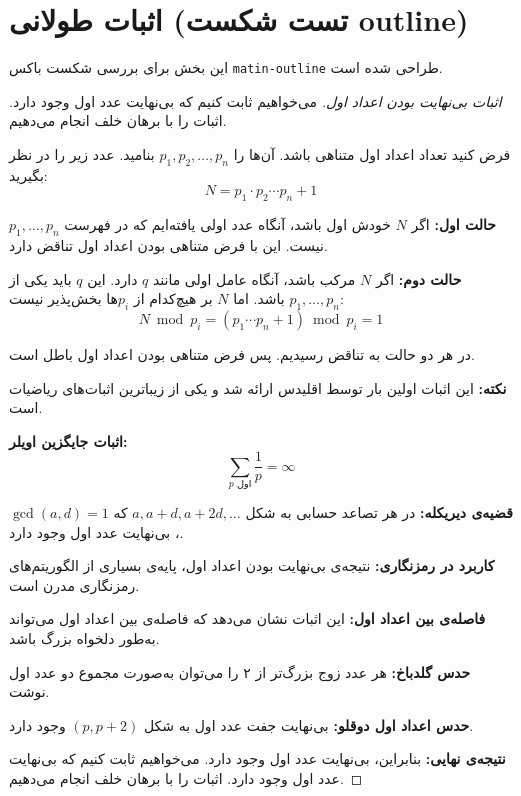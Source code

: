 \documentclass{matinbook}
\begin{document}
\section{اثبات طولانی (تست شکست outline)}
\label{sec:long-proof}

این بخش برای بررسی شکست باکس \texttt{matin-outline} طراحی
شده است.

\begin{proof}[اثبات بی‌نهایت بودن اعداد اول]
    می‌خواهیم ثابت کنیم که بی‌نهایت عدد اول وجود دارد.
    اثبات را با برهان خلف انجام می‌دهیم.

    فرض کنید تعداد اعداد اول متناهی باشد. آن‌ها را
    $p_1, p_2, \ldots, p_n$ بنامید. عدد زیر را در نظر بگیرید:
    \[
    N = p_1 \cdot p_2 \cdots p_n + 1
    \]

    \textbf{حالت اول:} اگر $N$ خودش اول باشد، آنگاه عدد
    اولی یافته‌ایم که در فهرست $p_1, \ldots, p_n$ نیست.
    این با فرض متناهی بودن اعداد اول تناقض دارد.

    \textbf{حالت دوم:} اگر $N$ مرکب باشد، آنگاه عامل اولی
    مانند $q$ دارد. این $q$ باید یکی از $p_1, \ldots, p_n$
    باشد. اما $N$ بر هیچ‌کدام از $p_i$ها بخش‌پذیر نیست:
    \[
    N \bmod p_i = (p_1 \cdots p_n + 1) \bmod p_i = 1
    \]

    در هر دو حالت به تناقض رسیدیم. پس فرض متناهی بودن
    اعداد اول باطل است.

    \textbf{نکته:} این اثبات اولین بار توسط اقلیدس ارائه شد
    و یکی از زیباترین اثبات‌های ریاضیات است.

    \textbf{اثبات جایگزین اویلر:}
    \[
    \sum_{p \text{ اول}} \frac{1}{p} = \infty
    \]

    \textbf{قضیه‌ی دیریکله:} در هر تصاعد حسابی به شکل
    $a, a+d, a+2d, \ldots$ که $\gcd(a, d) = 1$،
    بی‌نهایت عدد اول وجود دارد.

    \textbf{کاربرد در رمزنگاری:} نتیجه‌ی بی‌نهایت بودن
    اعداد اول، پایه‌ی بسیاری از الگوریتم‌های رمزنگاری
    مدرن است.

    \textbf{فاصله‌ی بین اعداد اول:} این اثبات نشان می‌دهد
    که فاصله‌ی بین اعداد اول می‌تواند به‌طور دلخواه بزرگ
    باشد.

    \textbf{حدس گلدباخ:} هر عدد زوج بزرگ‌تر از ۲ را می‌توان
    به‌صورت مجموع دو عدد اول نوشت.

    \textbf{حدس اعداد اول دوقلو:} بی‌نهایت جفت عدد اول
    به شکل $(p, p+2)$ وجود دارد.

    \textbf{نتیجه‌ی نهایی:} بنابراین، بی‌نهایت عدد اول
    وجود دارد.
        می‌خواهیم ثابت کنیم که بی‌نهایت عدد اول وجود دارد.
    اثبات را با برهان خلف انجام می‌دهیم.


\end{proof}
\end{document}
